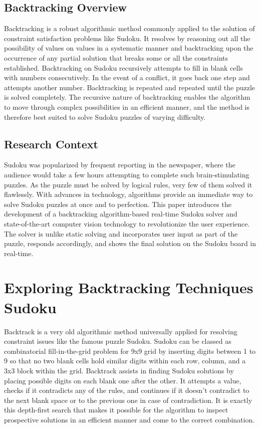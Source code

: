\documentclass[conference]{IEEEtran}
\begin{document}
\subsection{Backtracking Overview} 
Backtracking is a robust algorithmic method commonly applied to the solution of constraint satisfaction problems like Sudoku. It resolves by reasoning out all the possibility of values on values in a systematic manner and backtracking upon the occurrence of any partial solution that breaks some or all the constraints established. Backtracking on Sudoku recursively attempts to fill in blank cells with numbers consecutively. In the event of a conflict, it goes back one step and attempts another number. Backtracking is repeated and repeated until the puzzle is solved completely. The recursive nature of backtracking enables the algorithm to move through complex possibilities in an efficient manner, and the method is therefore best suited to solve Sudoku puzzles of varying difficulty.
\subsection{Research Context}
Sudoku was popularized by frequent reporting in the newspaper, where the audience would take a few hours attempting to complete such brain-stimulating puzzles. As the puzzle must be solved by logical rules, very few of them solved it flawlessly. With advances in technology, algorithms provide an immediate way to solve Sudoku puzzles at once and to perfection. This paper introduces the development of a backtracking algorithm-based real-time Sudoku solver and state-of-the-art computer vision technology to revolutionize the user experience. The solver is unlike static solving and incorporates user input as part of the puzzle, responds accordingly, and shows the final solution on the Sudoku board in real-time.

\section{Exploring Backtracking Techniques Sudoku}
Backtrack is a very old algorithmic method universally applied for resolving constraint issues like the famous puzzle Sudoku. Sudoku can be classed as combinatorial fill-in-the-grid problem for 9x9 grid by inserting digits between 1 to 9 so that no two blank cells hold similar digits within each row, column, and a 3x3 block within the grid. Backtrack assists in finding Sudoku solutions by placing possible digits on each blank one after the other. It attempts a value, checks if it contradicts any of the rules, and continues if it doesn't contradict to the next blank space or to the previous one in case of contradiction. It is exactly this depth-first search that makes it possible for the algorithm to inspect prospective solutions in an efficient manner and come to the correct combination.
\end{document}
